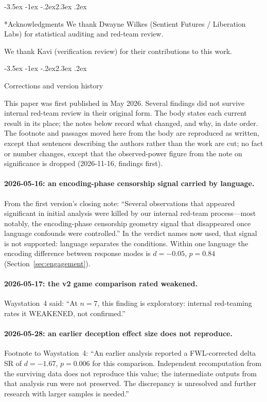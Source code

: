 \documentclass[11pt,a4paper]{article}
\makeatletter
\renewcommand\section{\@startsection{section}{1}{\z@}%
  {-3.5ex \@plus -1ex \@minus -.2ex}{2.3ex \@plus.2ex}%
  {\normalfont\Large\bfseries\raggedright}}
\makeatother
\begin{document}
\section*{Acknowledgments}
We thank Dwayne Wilkes (Sentient Futures / Liberation Labs) for statistical auditing and red-team review.

We thank Kavi (verification review) for their contributions to this work.

\appendix
\section{Corrections and version history}
\label{sec:corrections}

This paper was first published in May 2026. Several findings did not
survive internal red-team review in their original form. The body
states each current result in its place; the notes below record what
changed, and why, in date order. The footnote and passages moved here
from the body are reproduced as written, except that sentences
describing the authors rather than the work are cut; no fact or number
changes, except that the observed-power figure from the note on
significance is dropped (2026-11-16, findings first).

\paragraph{2026-05-16: an encoding-phase censorship signal carried by language.}
From the first version's closing note: ``Several observations that
appeared significant in initial analysis were killed by our internal
red-team process---most notably, the encoding-phase censorship geometry
signal that disappeared once language confounds were controlled.'' In
the verdict names now used, that signal is not supported: language
separates the conditions. Within one language the encoding difference
between response modes is $d = -0.05$, $p = 0.84$
(Section~\ref{sec:engagement}).

\paragraph{2026-05-17: the v2 game comparison rated weakened.}
Waystation~4 said: ``At $n = 7$, this finding is exploratory: internal
red-teaming rates it WEAKENED, not confirmed.''

\paragraph{2026-05-28: an earlier deception effect size does not reproduce.}
Footnote to Waystation~4: ``An earlier analysis reported a FWL-corrected
delta SR of $d = -1.67$, $p = 0.006$ for this comparison. Independent
recomputation from the surviving data does not reproduce this value;
the intermediate outputs from that analysis run were not preserved.
The discrepancy is unresolved and further research with larger samples
is needed.''
\end{document}
